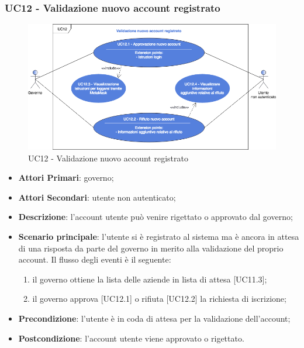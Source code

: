 \subsubsection{UC12 - Validazione nuovo account registrato}
\begin{figure}[h]
	\includegraphics[width=15.5cm]{res/images/UC12Validazione.png} %
	\centering
	\caption{UC12 - Validazione nuovo account registrato}
	
\end{figure}
\begin{itemize}
	\item \textbf{Attori Primari}:
	governo;
	\item \textbf{Attori Secondari}:
	utente non autenticato;
	\item \textbf{Descrizione}: l'account utente può venire rigettato o approvato dal governo;
	\item \textbf{Scenario principale}: l'utente si è registrato al sistema ma è ancora in attesa di una risposta da parte del governo in merito alla validazione del proprio account. Il flusso degli eventi è il seguente:
	\begin{enumerate}[label=\alph*.]
		\item il governo ottiene la lista delle aziende in lista di attesa [UC11.3];
		\item il governo approva [UC12.1] o rifiuta [UC12.2] la richiesta di iscrizione;
	\end{enumerate}
	\item \textbf{Precondizione}: l'utente è in coda di attesa per la validazione dell'account;
	\item \textbf{Postcondizione}: l'account utente viene approvato o rigettato. 
\end{itemize}
